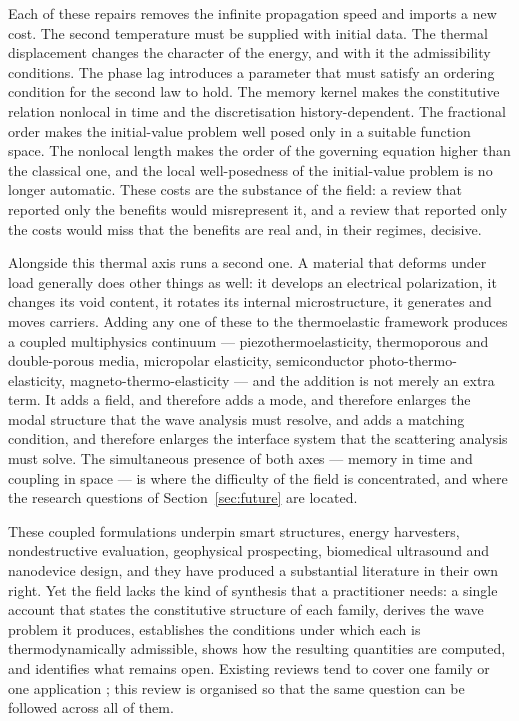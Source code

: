 Each of these repairs removes the infinite propagation speed and imports a new cost. The second temperature must be supplied with initial data. The thermal displacement changes the character of the energy, and with it the admissibility conditions. The phase lag introduces a parameter that must satisfy an ordering condition for the second law to hold. The memory kernel makes the constitutive relation nonlocal in time and the discretisation history-dependent. The fractional order makes the initial-value problem well posed only in a suitable function space. The nonlocal length makes the order of the governing equation higher than the classical one, and the local well-posedness of the initial-value problem is no longer automatic. These costs are the substance of the field: a review that reported only the benefits would misrepresent it, and a review that reported only the costs would miss that the benefits are real and, in their regimes, decisive.

Alongside this thermal axis runs a second one. A material that deforms under load generally does other things as well: it develops an electrical polarization, it changes its void content, it rotates its internal microstructure, it generates and moves carriers. Adding any one of these to the thermoelastic framework produces a coupled multiphysics continuum --- piezothermoelasticity, thermoporous and double-porous media, micropolar elasticity, semiconductor photo-thermo-elasticity, magneto-thermo-elasticity --- and the addition is not merely an extra term. It adds a field, and therefore adds a mode, and therefore enlarges the modal structure that the wave analysis must resolve, and adds a matching condition, and therefore enlarges the interface system that the scattering analysis must solve. The simultaneous presence of both axes --- memory in time and coupling in space --- is where the difficulty of the field is concentrated, and where the research questions of Section~\ref{sec:future} are located.

These coupled formulations underpin smart structures, energy harvesters, nondestructive evaluation, geophysical prospecting, biomedical ultrasound and nanodevice design, and they have produced a substantial literature in their own right. Yet the field lacks the kind of synthesis that a practitioner needs: a single account that states the constitutive structure of each family, derives the wave problem it produces, establishes the conditions under which each is thermodynamically admissible, shows how the resulting quantities are computed, and identifies what remains open. Existing reviews tend to cover one family or one application \cite{Shakeriaski2021,Chandrasekharaiah1998,Joseph1989,Askes2006}; this review is organised so that the same question can be followed across all of them.


